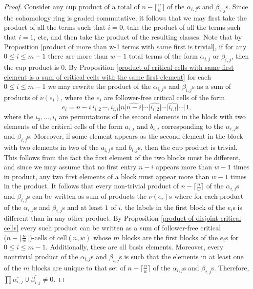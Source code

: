 \begin{proof}
Consider any cup product of a total of $n-\big\lceil\frac{n}{w}\big\rceil$ of the $\alpha_{i,j}$s and $\beta_{i,j}$s.
Since the cohomology ring is graded commutative, it follows that we may first take the product of all the terms such that $i=0$, take the product of all the terms such that $i=1$, etc, and then take the product of the resulting classes.
Note that by Proposition \ref{product of more than w-1 terms with same first is trivial}, if for any $0\le i\le m-1$ there are more than $w-1$ total terms of the form $\alpha_{i,j}$ or $\beta_{i,j}$, then the cup product is $0$. 
By Proposition \ref{product of critical cells with same first element is a sum of critical cells with the same first element} for each  $0\le i\le m-1$ we may rewrite the product of the $\alpha_{i, j}$s and $\beta_{i,j}$s as a sum of products of $\nu(e_{i})$, where the $e_{i}$ are follower-free critical cells of the form
\[
e_{i}=n-i\, i_{i,2}\, \cdots, i_{i,l}|n|\widehat{n-i}|\cdots|\widehat{i_{i,2}}|\cdots|\widehat{i_{i,l}}|\cdots|1,
\]
where the $i_{2},\dots, i_{l}$ are permutations of the second elements in the block with two elements of the critical cells of the form $a_{i,j}$ and $b_{i,j}$ corresponding to the $\alpha_{i, j}$s and $\beta_{i,j}$s.
Moreover, if some element appears as the second element in the block with two elements in two of the $a_{i,j}$s and $b_{i,j}$s, then the cup product is trivial.
This follows from the fact the first element of the two blocks must be different, and since we may assume that no first entry $n-i$ appears more than $w-1$ times in product, any two first elements of a block must appear more than $w-1$ times in the product.
It follows that every non-trivial product of $n-\big\lceil\frac{n}{w}\big\rceil$ of the $\alpha_{i,j}$s and $\beta_{i,j}$s can be written as sum of products the $\nu(e_{i})$s where for each product of the $\alpha_{i,j}$s and $\beta_{i,j}$s and at least $1$ of $i$, the labels in the first block of the $e_{i}$s is different than in any other product.
By Proposition \ref{product of disjoint critical cells} every such product can be written as a sum of follower-free critical $\big(n-\big\lceil\frac{n}{w}\big\rceil\big)$-cells of $\text{cell}(n,w)$ whose $m$ blocks are the first blocks of the $e_{i}$s for $0\le i\le m-1$.
Additionally, these are all basis elements.
Moreover, every nontrivial product of the $\alpha_{i, j}$s and $\beta_{i,j}$s is such that the elements in at least one of the $m$ blocks are unique to that set of $n-\big\lceil\frac{n}{w}\big\rceil$ of the $\alpha_{i,j}$s and $\beta_{i,j}$s.
Therefore, $\prod\overline{\alpha_{i,j}}\cup\overline{\beta_{i,j}}\neq 0$.
\end{proof}

